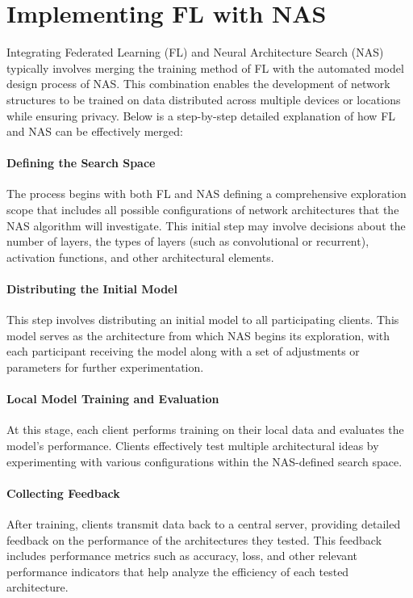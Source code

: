\documentclass[conference]{IEEEtran}
\begin{document}
\section{Implementing FL with NAS}
Integrating Federated Learning (FL) and Neural Architecture Search (NAS) typically involves merging the training method of FL with the automated model design process of NAS.  This combination enables the development of network structures to be trained on data distributed across multiple devices or locations while ensuring privacy. Below is a step-by-step detailed explanation of how FL and NAS can be effectively merged:

\paragraph{Defining the Search Space}
The process begins with both FL and NAS defining a comprehensive exploration scope that includes all possible configurations of network architectures that the NAS algorithm will investigate. This initial step may involve decisions about the number of layers, the types of layers (such as convolutional or recurrent), activation functions, and other architectural elements.

\paragraph{Distributing the Initial Model}
This step involves distributing an initial model to all participating clients. This model serves as the architecture from which NAS begins its exploration, with each participant receiving the model along with a set of adjustments or parameters for further experimentation.

\paragraph{Local Model Training and Evaluation}
At this stage, each client performs training on their local data and evaluates the model's performance. Clients effectively test multiple architectural ideas by experimenting with various configurations within the NAS-defined search space.

\paragraph{Collecting Feedback}
After training, clients transmit data back to a central server, providing detailed feedback on the performance of the architectures they tested. This feedback includes performance metrics such as accuracy, loss, and other relevant performance indicators that help analyze the efficiency of each tested architecture.
\end{document}
